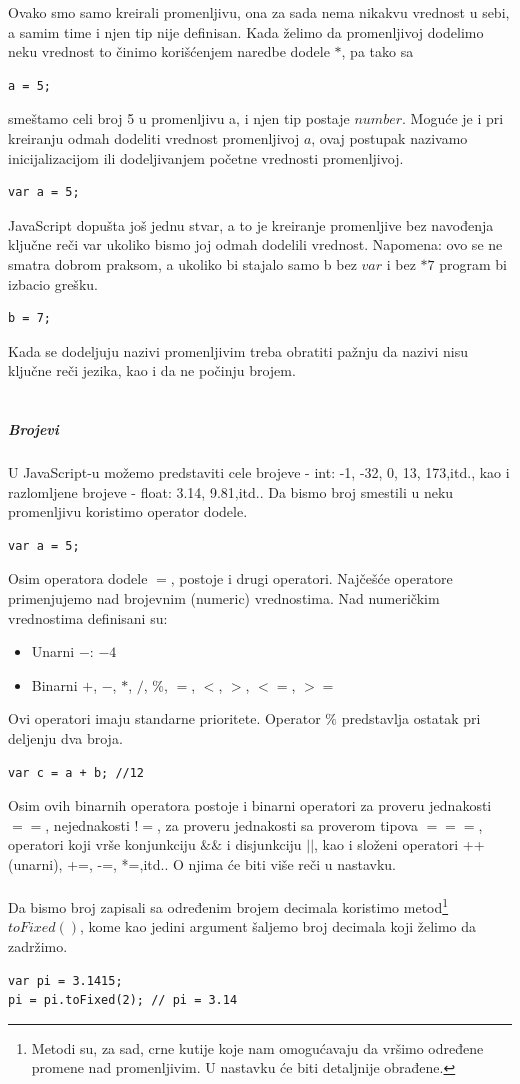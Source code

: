 \documentclass[a4paper]{article}
\begin{document}
Ovako smo samo kreirali promenljivu, ona za sada nema nikakvu vrednost u sebi, a samim time i njen tip nije definisan. Kada želimo da promenljivoj dodelimo neku vrednost to činimo korišćenjem naredbe dodele $*$, pa tako sa
\begin{verbatim}
a = 5;    
\end{verbatim}
smeštamo celi broj 5 u promenljivu a, i njen tip postaje $number$.
Moguće je i pri kreiranju odmah dodeliti vrednost promenljivoj $a$, ovaj postupak nazivamo inicijalizacijom ili dodeljivanjem početne vrednosti promenljivoj.
\begin{verbatim}
var a = 5;    
\end{verbatim}
JavaScript dopušta još jednu stvar, a to je kreiranje promenljive bez navođenja ključne reči var ukoliko bismo joj odmah dodelili vrednost. Napomena: ovo se ne smatra dobrom praksom, a ukoliko bi stajalo samo b bez $var$ i bez $*7$ program bi izbacio grešku.
\begin{verbatim}
b = 7;    
\end{verbatim}
Kada se dodeljuju nazivi promenljivim treba obratiti pažnju da nazivi nisu ključne reči jezika, kao i da ne počinju brojem.\\\\

\subparagraph{Brojevi}
U JavaScript-u možemo predstaviti cele brojeve - int: -1, -32, 0, 13, 173,itd., kao i razlomljene brojeve - float: 3.14, 9.81,itd..
Da bismo broj smestili u neku promenljivu koristimo operator dodele.
\begin{verbatim}
var a = 5; 
\end{verbatim}
Osim operatora dodele $=$, postoje i drugi operatori. Najčešće operatore primenjujemo nad brojevnim (numeric) vrednostima. Nad numeričkim vrednostima definisani su:
\begin{itemize}
    \item Unarni $-$: $-4$
    \item Binarni $+$, $-$, $*$, $/$, $\%$, $=$, $<$, $>$, $<=$, $>=$
\end{itemize}
Ovi operatori imaju standarne prioritete. Operator $\%$ predstavlja ostatak pri deljenju dva broja.\\
\begin{verbatim}
var c = a + b; //12
\end{verbatim}
Osim ovih binarnih operatora postoje i binarni operatori za proveru jednakosti $==$, nejednakosti $!=$, za proveru jednakosti sa proverom tipova $===$, operatori koji vrše konjunkciju $\&\&$ i disjunkciju $||$, kao i složeni operatori ++(unarni), +=, -=, *=,itd.. O njima će biti više reči u nastavku. \\\\
Da bismo broj zapisali sa određenim brojem decimala koristimo metod\footnote{Metodi su, za sad, crne kutije koje nam omogućavaju da vršimo određene promene nad promenljivim. U nastavku će biti detaljnije obrađene.} $toFixed()$, kome kao jedini argument šaljemo broj decimala koji želimo da zadržimo. 
\begin{verbatim}
var pi = 3.1415;
pi = pi.toFixed(2); // pi = 3.14
\end{verbatim}
\end{document}
